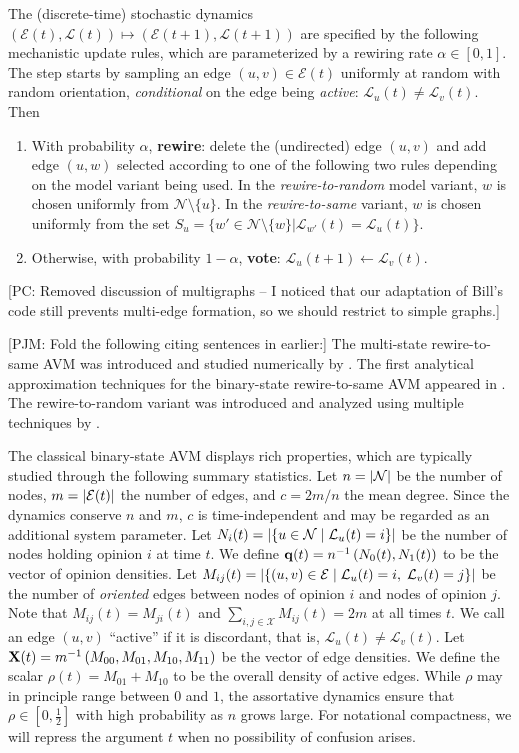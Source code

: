\documentclass[review, onefignum, onetabnum]{siamart171218}
\newcommand{\pjm}[1]{{\color{blue}[PJM: #1]}}
\newcommand{\pc}[1]{{\color{comment_purple}[PC: #1]}}
\begin{document}
	The (discrete-time) stochastic dynamics $(\mathcal{E}(t), \mathcal{L}(t)) \mapsto (\mathcal{E}(t+1), \mathcal{L}(t+1))$ are specified by the following mechanistic update rules, which are parameterized by a rewiring rate $\alpha\in [0,1]$. 
	The step starts by sampling an edge $(u,v) \in \mathcal{E}(t)$ uniformly at random with random orientation, \emph{conditional} on the edge being \emph{active}: $\mathcal{L}_u(t) \neq \mathcal{L}_v(t)$. 
	Then
		\begin{enumerate}
			\item With probability $\alpha$, \textbf{rewire}: delete the (undirected) edge $(u,v)$ and add edge $(u,w)$ selected according to one of the following two rules depending on the model variant being used. 
			In the \emph{rewire-to-random} model variant, $w$ is chosen uniformly from $\mathcal{N}\setminus \{u\}$. 
			In the \emph{rewire-to-same} variant, $w$ is chosen uniformly from the set $S_u = \{w' \in \mathcal{N}\setminus \{w\} | \mathcal{L}_{w'}(t) = \mathcal{L}_u(t)\}$. 
			\item Otherwise, with probability $1-\alpha$, \textbf{vote}:  $\mathcal{L}_u(t+1) \gets \mathcal{L}_v(t)$. 
		\end{enumerate}
	\pc{Removed discussion of multigraphs -- I noticed that our adaptation of Bill's code still prevents multi-edge formation, so we should restrict to simple graphs.}

\pjm{Fold the following citing sentences in earlier:} The multi-state rewire-to-same AVM was introduced and studied numerically by \cite{Holme2006}.
	The first analytical approximation techniques for the binary-state rewire-to-same AVM appeared in \cite{Kimura2008}. 
	The rewire-to-random variant was introduced and analyzed using multiple techniques by \cite{Durrett2012}.  

	The classical binary-state AVM displays rich properties, which are typically studied through the following summary statistics. 
	Let $n = \left|\mathcal{N}\right|$ be the number of nodes, $m = \left|\mathcal{E}(t)\right|$ the number of edges, and $c = {2m}/{n}$ the mean degree.
	Since the dynamics conserve $n$ and $m$, $c$ is time-independent and may be regarded as an additional system parameter. 
	Let $N_i(t) = \left|\{u \in \mathcal{N} \;|\;\mathcal{L}_u(t) = i \}\right|$ be the number of nodes holding opinion $i$ at time $t$. 
	We define $\mathbf{q}(t) = n^{-1}\left(N_0(t), N_1(t)\right)$ to be the vector of opinion densities.
	Let $M_{ij}(t) = \left|\{(u,v) \in \mathcal{E} \;|\; \mathcal{L}_u(t) = i,\; \mathcal{L}_v(t) = j \}\right|$ be the number of \emph{oriented} edges between nodes of opinion $i$ and nodes of opinion $j$. 
	Note that $M_{ij}(t) = M_{ji}(t)$ and $\sum_{i,j \in \mathcal{X}} M_{ij}(t) = 2m$ at all times $t$.
	We call an edge $(u,v)$ ``active'' if it is discordant, that is, $\mathcal{L}_u(t) \neq \mathcal{L}_v(t)$. 
	Let $\mathbf{X}(t) = m^{-1}\left(M_{00}, M_{01}, M_{10}, M_{11}\right)$ be the vector of edge densities. 
	We define the scalar $\rho(t) = M_{01} + M_{10}$ to be the overall density of active edges. 
	While $\rho$ may in principle range between $0$ and $1$, the assortative dynamics ensure that $\rho \in [0,\frac{1}{2}]$ with high probability as $n$ grows large. 
	For notational compactness, we will repress the argument $t$ when no possibility of confusion arises.
\end{document}
